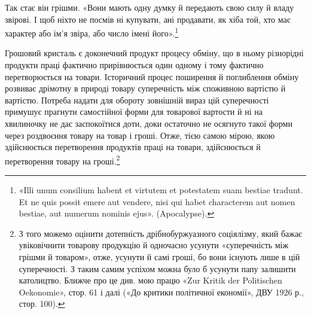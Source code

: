 \parcont{}  %
Так стає він грішми. «Вони мають одну думку й передають свою
силу й владу звірові. І щоб ніхто не посмів ні купувати, ані
продавати, як хіба той, хто має характер або ім’я звіра, або число
імені його».\footnote*{
«Illi unum consilium habent et virtutem et potestatem suam bestiae
tradunt. Et ne quis possit emere aut vendere, nisi qui habet characterem
aut nomen bestiae, aut numerum nominis ejus». (Apocalypse).
}

Грошовий кристаль є доконечний продукт процесу обміну,
що в ньому різнорідні продукти праці фактично прирівнюється
один одному і тому фактично перетворюється на товари. Історичний
процес поширення й поглиблення обміну розвиває дрімотну
в природі товару суперечність між споживною вартістю й вартістю.
Потреба надати для обороту зовнішній вираз цій суперечності
примушує прагнути самостійної форми для товарової вартости
й ні на хвилиночку не дає заспокоїтися доти, доки остаточно
не осягнуто такої форми через роздвоєння товару на товар і
гроші. Отже, тією самою мірою, якою здійснюється перетворення
продуктів праці на товари, здійснюється й перетворення товару
на гроші.\footnote{
З того можемо оцінити дотепність дрібнобуржуазного соціялізму,
який бажає увіковічнити товарову продукцію й одночасно усунути «суперечність
між грішми й товаром», отже, усунути й самі гроші, бо вони
існують лише в цій суперечності. З таким самим успіхом можна було б
усунути папу залишити католицтво. Ближче про це див. мою працю «Zur
Kritik der Politischen Oekonomie», стор. 61 і далі («До критики політичної
економії», ДВУ 1926 р., стор. 100).
}

